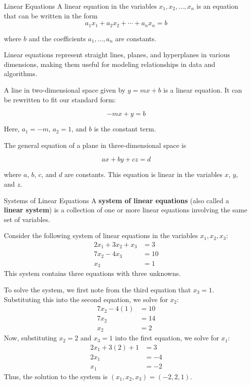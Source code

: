 \begin{definition}{Linear Equations} A linear equation in the variables $x_1, x_2, \ldots, x_n$ is an equation that can be written in the form
\[
a_1 x_1 + a_2 x_2 + \cdots + a_n x_n = b
\]

where $b$ and the coefficients $a_1, \ldots, a_n$ are constants.

\end{definition}

Linear equations represent straight lines, planes, and hyperplanes in various dimensions, making them useful for modeling relationships in data and algorithms.

\begin{example} A line in two-dimensional space given by $y = m x + b$ is a linear equation. It can be rewritten to fit our standard form:

    \[
-m x+y=b
\]

Here, $a_1 = -m$, $a_2 = 1$, and $b$ is the constant term. \end{example}

\begin{example} The general equation of a plane in three-dimensional space is

\[
a x+b y+c z=d
\]

where $a$, $b$, $c$, and $d$ are constants. This equation is linear in the variables $x$, $y$, and $z$.
\end{example}

\begin{definition}{Systems of Linear Equations} A \textbf{system of linear equations} (also called a \textbf{linear system}) is a collection of one or more linear equations involving the same set of variables. \end{definition}

\begin{example} Consider the following system of linear equations in the variables $x_1, x_2, x_3$:
\[
\begin{aligned}
2x_1 + 3x_2 + x_3 &= 3 \\
7x_2 - 4x_3 &= 10 \\
x_3 &= 1
\end{aligned}
\]
This system contains three equations with three unknowns.

\end{example}

To solve the system, we first note from the third equation that $x_3 = 1$. Substituting this into the second equation, we solve for $x_2$:
\[
\begin{aligned}
7x_2 - 4(1) &= 10 \\
7x_2 &= 14 \\
x_2 &= 2
\end{aligned}
\]
Now, substituting $x_2 = 2$ and $x_3 = 1$ into the first equation, we solve for $x_1$:
\[
\begin{aligned}
2x_1 + 3(2) + 1 &= 3 \\
2x_1 &= -4 \\
x_1 &= -2
\end{aligned}
\]
Thus, the solution to the system is $\left(x_1, x_2, x_3\right) = (-2, 2, 1)$.

